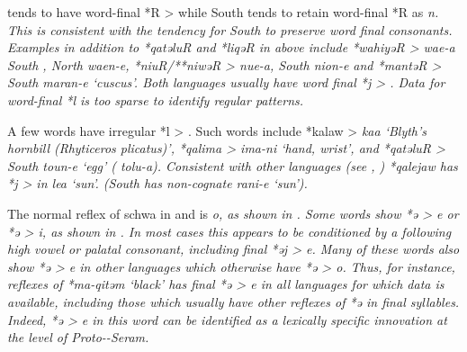  tends to have word-final *R > {\0} while South 
tends to retain word-final *R as \it{n}.
This is consistent with the tendency for South  to preserve word final consonants.
Examples in addition to *qatəluR
and *liqəR in  above  include *wahiyəR >  \it{wae-a}
South , North  \it{waen-e}, *niuR/**niwəR >  \it{nue-a},
South  \it{nion-e} and *mantəR > South  \it{maran-e} ‘cuscus’.
Both languages usually have word final *j > {\0}.
Data for word-final *l is too sparse to identify regular patterns.

A few words have irregular *l > {\0}.
Such words include *kalaw >  \it{kaa} ‘Blyth’s hornbill
(Rhyticeros plicatus)’, *qalima >  \it{ima-ni} ‘hand,
wrist’, and *qatəluR > South  \it{toun-e} ‘egg’ ( \it{tolu-a}).
Consistent with other  languages (see ,
) *qalejaw  has *j > {\0} in  \it{lea} ‘sun’.
(South  has non-cognate \it{rani-e} ‘sun’).

The normal reflex of schwa in 
and  is \it{o},
as shown in .
Some words show *ə > \it{e} or *ə > \it{i},
as shown in .
In most cases this appears to be conditioned by a following high
vowel or palatal consonant,
including final *əj > \it{e}.
Many of these words also show *ə > e in other 
languages which otherwise have *ə > \it{o}.
Thus, for instance, reflexes of *ma-qitəm ‘black’ has final *ə
> \it{e} in all  languages for which data is
available, including those which usually have other reflexes of *ə in final syllables.
Indeed, *ə > \it{e} in this word can be identified as a lexically
specific innovation at the level of Proto--Seram.

